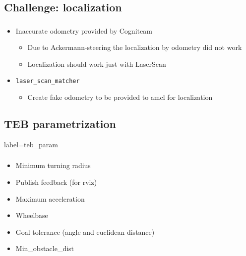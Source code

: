 \documentclass[numberofslides]{AMSBeamer}
\begin{document}
\subsection{Challenge: localization}
\begin{frame}[label=challenge_localization]
	\frametitle{\insertsectionhead}%
         \textbf{\insertsubsectionhead}
     \begin{itemize}
        \item Inaccurate odometry provided by Cogniteam
        \begin{itemize}
            \item Due to Ackermann-steering the localization by odometry did not work
            \item Localization should work just with LaserScan
        \end{itemize}
        \item \texttt{laser\_scan\_matcher}
        \begin{itemize}
            \item Create fake odometry to be provided to amcl for localization
        \end{itemize}
     \end{itemize}
\end{frame}

\begin{frame}[label=video]
	\frametitle{\insertsectionhead}
         \textbf{\insertsubsectionhead}
    \begin{center}
    \end{center}
\end{frame}

\subsection{TEB parametrization}
\begin{frame}{label=teb_param}
    \frametitle{\insertsectionhead}
    \textbf{\insertsubsectionhead}
    \begin{itemize}
        \item Minimum turning radius
        \item Publish feedback (for rviz)
        \item Maximum acceleration
        \item Wheelbase
        \item Goal tolerance (angle and euclidean distance)
        \item Min\_obstacle\_dist
    \end{itemize}
\end{frame}
\end{document}
